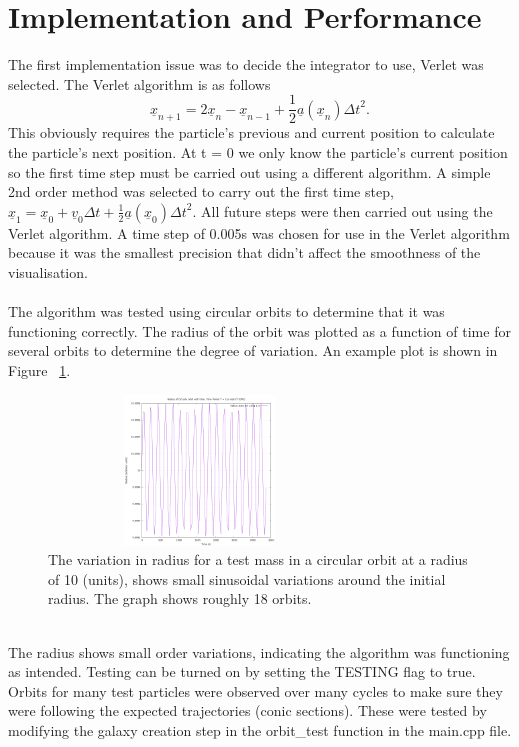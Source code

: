 \documentclass[10pt,a4paper]{article}
\begin{document}
\section{Implementation and Performance}
The first implementation issue was to decide the integrator to use, Verlet was selected. The Verlet algorithm is as follows 
\begin{equation}
	\underline{x}_{n+1} = 2 \underline{x}_n - \underline{x}_{n-1} + \frac{1}{2}  \underline{a}(\underline{x}_n) {\Delta t }^ 2 .
\end{equation}  
This obviously requires the particle's previous and current position to calculate the particle's next position. At t = 0 we only know the particle's current position so the first time step must be carried out using a different algorithm. A simple 2nd order method was selected to carry out the first time step, $\underline{x}_{1} =  \underline{x}_0 + \underline{v}_0 {\Delta t} + \frac{1}{2}  \underline{a}(\underline{x}_0) {\Delta t }^ 2 .$ All future steps were then carried out using the Verlet algorithm. A time step of 0.005s was chosen for use in the Verlet algorithm because it was the smallest precision that didn't affect the smoothness of the visualisation.
\\
\\
The algorithm was tested using circular orbits to determine that it was functioning correctly. The radius of the orbit was plotted as a function of time for several orbits to determine the degree of variation. An example plot is shown in Figure ~\ref{fig:fig}. 
\begin{figure}[ht!]
\centering
\includegraphics[width=80mm, height=40mm]{../output/Radius.png}
\caption{The variation in radius for a test mass in a circular orbit at a radius of 10 (units), shows small sinusoidal variations around the initial radius. The graph shows roughly 18 orbits.
\label{fig:fig}}
\end{figure}
\\
The radius shows small order variations, indicating the algorithm was functioning as intended. Testing can be turned on by setting the TESTING flag to true. Orbits for many test particles were observed over many cycles to make sure they were following the expected trajectories (conic sections). These were tested by modifying the galaxy creation step in the orbit\_test function in the main.cpp file.
\end{document}
